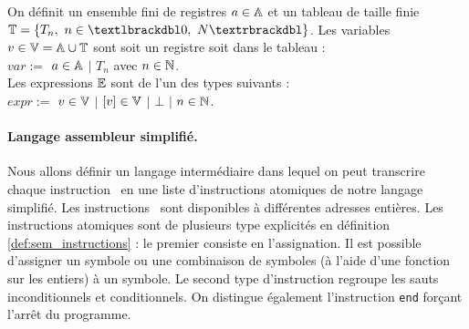 \begin{defi}
On définit un ensemble fini de registres $a\in\mathbb A$ et un tableau de taille finie $\BT=\{T_n,\ n\in\textlbrackdbl 0,\ N\textrbrackdbl\}$. Les variables $v\in\mathbb V=\mathbb A\cup\mathbb T$ sont soit un registre soit dans le tableau :\\
$var:=$ $a\in\mathbb A$ $|$ $T_n$ avec $n\in\mathbb N$.\\
Les expressions $\mathbb E$ sont de l'un des types suivants :\\
$expr:=$ $v\in\mathbb V$ $|$ $[v]\in\mathbb V$ $|$ $\bot$ $|$ $n\in\mathbb N$.%
\label{def:sem_conc_var}
\end{defi}


\paragraph{Langage assembleur simplifié.} Nous allons définir un langage intermédiaire dans lequel on peut transcrire chaque instruction \xq\ en une liste d'instructions atomiques de notre langage simplifié.
Les instructions \xq\ sont disponibles à différentes adresses entières. 
Les instructions atomiques sont de plusieurs type explicités en définition \ref{def:sem_instructions} : le premier consiste en l'assignation.
Il est possible d'assigner un symbole ou une combinaison de symboles (à l'aide d'une fonction sur les entiers) à un symbole. 
Le second type d'instruction regroupe les sauts inconditionnels et conditionnels.
On distingue également l'instruction \texttt{end} forçant l'arrêt du programme.

